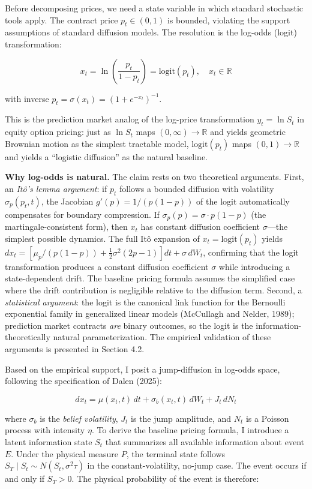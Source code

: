 \documentclass[12pt,a4paper]{article}
\begin{document}
Before decomposing prices, we need a state variable in which standard
stochastic tools apply. The contract price \(p_t \in (0,1)\) is bounded,
violating the support assumptions of standard diffusion models. The
resolution is the log-odds (logit) transformation:

\[x_t = \ln\!\left(\frac{p_t}{1 - p_t}\right) = \text{logit}(p_t), \quad x_t \in \mathbb{R}\]

with inverse \(p_t = \sigma(x_t) = (1 + e^{-x_t})^{-1}\).

This is the prediction market analog of the log-price transformation
\(y_t = \ln S_t\) in equity option pricing: just as \(\ln S_t\) maps
\((0, \infty) \to \mathbb{R}\) and yields geometric Brownian motion as
the simplest tractable model, \(\text{logit}(p_t)\) maps
\((0,1) \to \mathbb{R}\) and yields a ``logistic diffusion'' as the
natural baseline.

\textbf{Why log-odds is natural.} The claim rests on two theoretical
arguments. First, an \emph{Itô's lemma argument}: if \(p_t\) follows a
bounded diffusion with volatility \(\sigma_p(p_t, t)\), the Jacobian
\(g'(p) = 1/(p(1-p))\) of the logit automatically compensates for
boundary compression. If \(\sigma_p(p) = \sigma \cdot p(1-p)\) (the
martingale-consistent form), then \(x_t\) has constant diffusion
coefficient \(\sigma\)---the simplest possible dynamics. The full Itô
expansion of \(x_t = \text{logit}(p_t)\) yields
\(dx_t = [\mu_p/(p(1-p)) + \frac{1}{2}\sigma^2(2p-1)]dt + \sigma\,dW_t\),
confirming that the logit transformation produces a constant diffusion
coefficient \(\sigma\) while introducing a state-dependent drift. The
baseline pricing formula assumes the simplified case where the drift
contribution is negligible relative to the diffusion term. Second, a
\emph{statistical argument}: the logit is the canonical link function
for the Bernoulli exponential family in generalized linear models
(McCullagh and Nelder, 1989); prediction market contracts \emph{are}
binary outcomes, so the logit is the information-theoretically natural
parameterization. The empirical validation of these arguments is
presented in Section 4.2.

Based on the empirical support, I posit a jump-diffusion in log-odds
space, following the specification of Dalen (2025):

\[dx_t = \mu(x_t, t)\,dt + \sigma_b(x_t, t)\,dW_t + J_t\,dN_t\]

where \(\sigma_b\) is the \emph{belief volatility}, \(J_t\) is the jump
amplitude, and \(N_t\) is a Poisson process with intensity \(\eta\). To
derive the baseline pricing formula, I introduce a latent information
state \(S_t\) that summarizes all available information about event
\(E\). Under the physical measure \(P\), the terminal state follows
\(S_T \mid S_t \sim N(S_t, \sigma^2\tau)\) in the constant-volatility,
no-jump case. The event occurs if and only if \(S_T > 0\). The physical
probability of the event is therefore:
\end{document}
